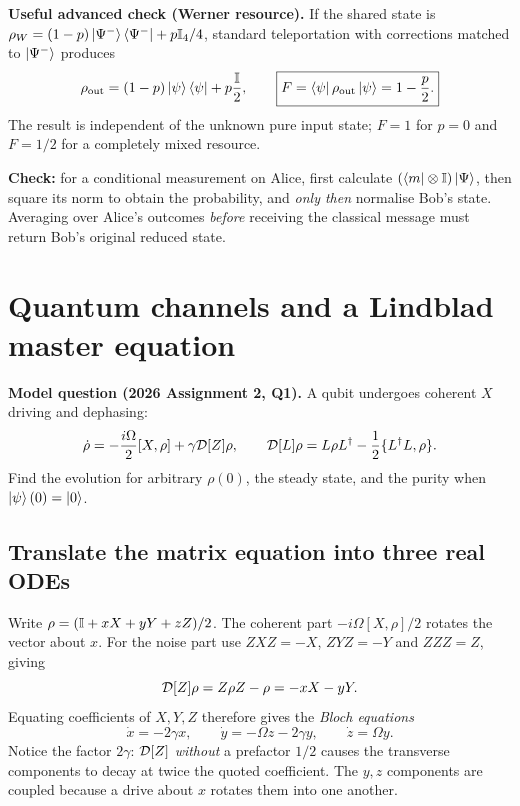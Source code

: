 \textbf{Useful advanced check (Werner resource).} If the shared state is $\rho_W=(1-p)\left\lvert \Psi^-\right\rangle\left\langle \Psi^-\right\rvert+p\mathbb{I}_4/4$, standard teleportation with corrections matched to $\left\lvert \Psi^-\right\rangle$ produces
\begin{equation}
\rho_{\rm out}=(1-p)\left\lvert \psi\right\rangle\left\langle \psi\right\rvert+p\frac{\mathbb{I}}2,\qquad
\boxed{F=\left\langle \psi\right\rvert\rho_{\rm out}\left\lvert \psi\right\rangle=1-\frac p2.}
\end{equation}
The result is independent of the unknown pure input state; $F=1$ for $p=0$ and $F=1/2$ for a completely mixed resource.

\begin{examtip}
\textbf{Check:} for a conditional measurement on Alice, first calculate $(\left\langle m\right\rvert\otimes\mathbb{I})\left\lvert \Psi\right\rangle$, then square its norm to obtain the probability, and \emph{only then} normalise Bob's state. Averaging over Alice's outcomes \emph{before} receiving the classical message must return Bob's original reduced state.
\end{examtip}

\section{Quantum channels and a Lindblad master equation}\label{sec:lindsol}
\textbf{Model question (2026 Assignment 2, Q1).} A qubit undergoes coherent $X$ driving and dephasing:
\begin{equation}\label{eq:driven_master}
\dot\rho=-\frac{i\Omega}{2}[X,\rho]+\gamma\mathcal{D}[Z]\rho,\qquad
\mathcal{D}[L]\rho=L\rho L^\dagger-\frac12\{L^\dagger L,\rho\}.
\end{equation}
Find the evolution for arbitrary $\rho(0)$, the steady state, and the purity when $\left\lvert \psi\right\rangle(0)=\left\lvert 0\right\rangle$.

\subsection{Translate the matrix equation into three real ODEs}
Write $\rho=(\mathbb{I}+xX+yY+zZ)/2$. The coherent part $-i\Omega[X,\rho]/2$ rotates the vector about $x$. For the noise part use $ZXZ=-X$, $ZYZ=-Y$ and $ZZZ=Z$, giving
\begin{equation}
\mathcal{D}[Z]\rho=Z\rho Z-\rho=-xX-yY.
\end{equation}
Equating coefficients of $X,Y,Z$ therefore gives the \emph{Bloch equations}
\begin{equation}\label{eq:blochode}
\boxed{\dot x=-2\gamma x,\qquad \dot y=-\Omega z-2\gamma y,\qquad \dot z=\Omega y.}
\end{equation}
Notice the factor $2\gamma$: $\mathcal{D}[Z]$ \emph{without} a prefactor $1/2$ causes the transverse components to decay at twice the quoted coefficient. The $y,z$ components are coupled because a drive about $x$ rotates them into one another.

